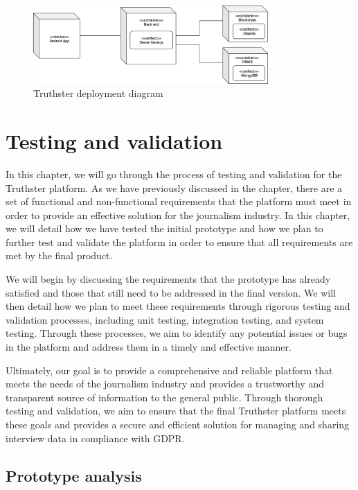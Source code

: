 \documentclass[target=mst,aauheader=]{thud}
\begin{document}
\begin{figure}
    \centering
    \includegraphics[width=0.8\textwidth]{images/deploymentDiagram.png}
    \caption{Truthster deployment diagram}
    \label{fig:deploymentDiagram}
\end{figure}

\chapter{Testing and validation}
\label{chapter:testingAndValidation}

In this chapter, we will go through the process of testing and validation for the Truthster platform. As we have previously discussed in the  chapter, there are a set of functional and non-functional requirements that the platform must meet in order to provide an effective solution for the journalism industry. In this chapter, we will detail how we have tested the initial prototype and how we plan to further test and validate the platform in order to ensure that all requirements are met by the final product.\par
We will begin by discussing the requirements that the prototype has already satisfied and those that still need to be addressed in the final version. We will then detail how we plan to meet these requirements through rigorous testing and validation processes, including unit testing, integration testing, and system testing. Through these processes, we aim to identify any potential issues or bugs in the platform and address them in a timely and effective manner.\par
Ultimately, our goal is to provide a comprehensive and reliable platform that meets the needs of the journalism industry and provides a trustworthy and transparent source of information to the general public. Through thorough testing and validation, we aim to ensure that the final Truthster platform meets these goals and provides a secure and efficient solution for managing and sharing interview data in compliance with GDPR.

\section{Prototype analysis}
\end{document}
